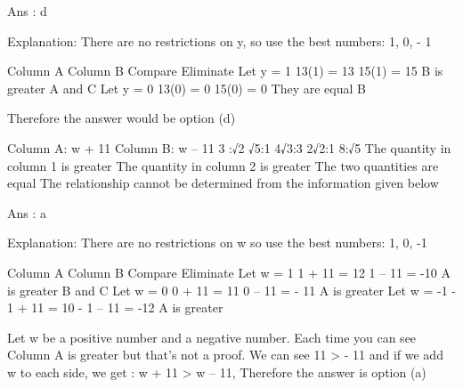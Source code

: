     Ans : d

    Explanation:
    There are no restrictions on y, so use the best numbers: 1, 0, - 1

        Column A    Column B    Compare     Eliminate
    Let y = 1   13(1) = 13  15(1) = 15  B is greater    A and C
    Let y = 0   13(0) = 0   15(0) = 0   They are equal  B

    Therefore the answer would be option (d)

    Column A: w + 11
    Column B: w – 11
        3 :√2
        √5:1
        4√3:3
        2√2:1
        8:√5 
        The quantity in column 1 is greater
        The quantity in column 2 is greater
        The two quantities are equal
        The relationship cannot be determined from the information given below 

    Ans : a

    Explanation:
    There are no restrictions on w so use the best numbers: 1, 0, -1

        Column A    Column B    Compare     Eliminate
    Let w = 1   1 + 11 = 12     1 – 11 = -10    A is greater    B and C
    Let w = 0   0 + 11 = 11     0 – 11 = - 11   A is greater      
    Let w = -1  - 1 + 11 = 10   - 1 – 11 = -12  A is greater      

    Let w be a positive number and a negative number. Each time you can see Column A is greater but that’s not a proof. We can see 11 > - 11 and if we add w to each side, we get : w + 11 > w – 11, Therefore the answer is option (a) 


